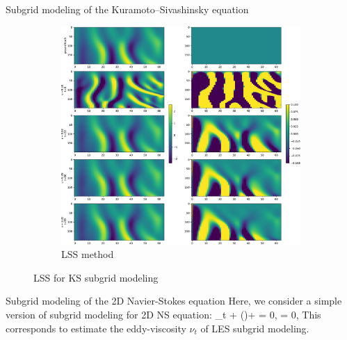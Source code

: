 \documentclass{beamer}
\begin{document}
\begin{frame}{Subgrid modeling of the Kuramoto–Sivashinsky equation}
\begin{figure}[ht]
\begin{subfigure}{0.5\linewidth}
			\includegraphics[width=\linewidth]{fig/ks-lss-cloudmap.pdf}
			\caption{LSS method}
		  \end{subfigure}
		  \caption{LSS for KS subgrid modeling}
\end{figure}
\end{frame}

\begin{frame}{Subgrid modeling of the 2D Navier-Stokes equation}
	Here, we consider a simple version of subgrid modeling for 2D NS equation:
	\bequ\label{NS}
	\p_t \mfu + (\mfu \cdot \nabla)\mfu + \nu\Delta \mfu = 0, \quad \nabla \cdot \mfu = 0,
	\eequ
	This corresponds to estimate the eddy-viscosity $\nu_t$ of LES subgrid modeling.
\end{frame}
\end{document}
